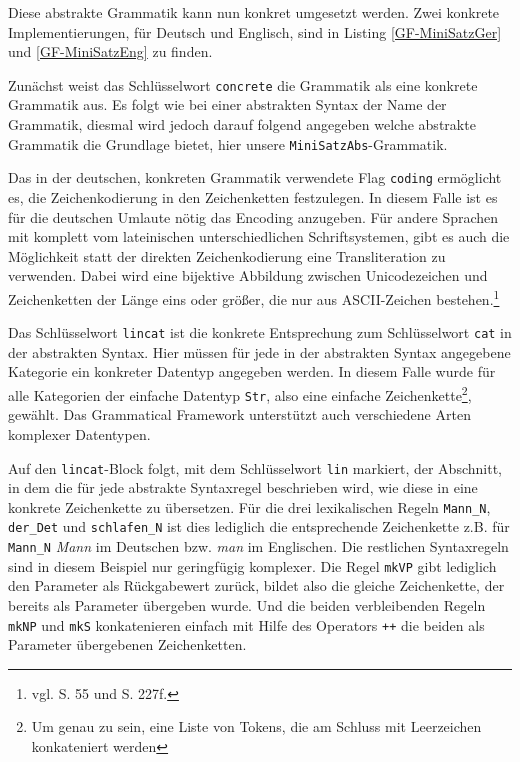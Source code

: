 \documentclass[12pt,abstract=on,titlepage,bibliography=totoc,ngerman,listof=totoc]{scrreprt}
\begin{document}

Diese abstrakte Grammatik kann nun konkret umgesetzt werden. Zwei konkrete Implementierungen, für Deutsch und Englisch, sind in Listing \ref{GF-MiniSatzGer} und \ref{GF-MiniSatzEng} zu finden. \par


Zunächst weist das Schlüsselwort \texttt{concrete} die Grammatik als eine konkrete Grammatik aus. Es folgt wie bei einer abstrakten Syntax der Name der Grammatik, diesmal wird jedoch darauf folgend angegeben welche abstrakte Grammatik die Grundlage bietet, hier unsere \texttt{MiniSatzAbs}-Grammatik. \par
Das in der deutschen, konkreten Grammatik verwendete Flag \texttt{coding} ermöglicht es, die Zeichenkodierung in den Zeichenketten festzulegen. In diesem Falle ist es für die deutschen Umlaute nötig das Encoding anzugeben. Für andere Sprachen mit komplett vom lateinischen unterschiedlichen Schriftsystemen, gibt es auch die Möglichkeit statt der direkten Zeichenkodierung eine Transliteration zu verwenden. Dabei wird eine bijektive Abbildung zwischen Unicodezeichen und Zeichenketten der Länge eins oder größer, die nur aus ASCII-Zeichen bestehen.\footnote{vgl. \cite{RANTA2011} S. 55 und S. 227f.} \par
Das Schlüsselwort \texttt{lincat} ist die konkrete Entsprechung zum Schlüsselwort \texttt{cat} in der abstrakten Syntax. Hier müssen für jede in der abstrakten Syntax angegebene Kategorie ein konkreter Datentyp angegeben werden. In diesem Falle wurde für alle Kategorien der einfache Datentyp \texttt{Str}, also eine einfache Zeichenkette\footnote{Um genau zu sein, eine Liste von Tokens, die am Schluss mit Leerzeichen konkateniert werden}, gewählt. Das Grammatical Framework unterstützt auch verschiedene Arten komplexer Datentypen. \par
Auf den \texttt{lincat}-Block folgt, mit dem Schlüsselwort \texttt{lin} markiert, der Abschnitt, in dem die für jede abstrakte Syntaxregel beschrieben wird, wie diese in eine konkrete Zeichenkette zu übersetzen. Für die drei lexikalischen Regeln \texttt{Mann\_N}, \texttt{der\_Det} und \texttt{schlafen\_N} ist dies lediglich die entsprechende Zeichenkette z.B. für \texttt{Mann\_N} \textit{Mann} im Deutschen bzw. \textit{man} im Englischen. Die restlichen Syntaxregeln sind in diesem Beispiel nur geringfügig komplexer. Die Regel \texttt{mkVP} gibt lediglich den Parameter als Rückgabewert zurück, bildet also die gleiche Zeichenkette, der bereits als Parameter übergeben wurde. Und die beiden verbleibenden Regeln \texttt{mkNP} und \texttt{mkS} konkatenieren einfach mit Hilfe des Operators \texttt{++} die beiden als Parameter übergebenen Zeichenketten. \par
\end{document}
